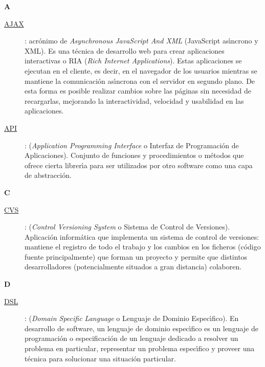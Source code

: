 {\bfseries {\Huge A}}\label{Apendice1:A}
\bigskip
\bigskip

\begin{description}
  \item[\underline{AJAX}\label{apend1:ajax}]: acr\'onimo de \textit{Asynchronous JavaScript And XML} (JavaScript as\'{\i}ncrono y XML). Es una t\'ecnica de desarrollo web para crear aplicaciones 
  interactivas o RIA (\textit{Rich Internet Applications}). Estas aplicaciones se ejecutan en el cliente, es decir, en el navegador de los usuarios mientras se 
  mantiene la comunicaci\'on as\'{\i}ncrona con el servidor en segundo plano. De esta forma es posible realizar cambios sobre las p\'aginas sin necesidad de 
  recargarlas, mejorando la interactividad, velocidad y usabilidad en las aplicaciones.
  \bigskip
\end{description}

\begin{description}
  \item[\underline{API}\label{apend1:api}]: (\textit{Application Programming Interface} o Interfaz de Programaci\'on de Aplicaciones). Conjunto de funciones y procedimientos o m\'etodos que 
  ofrece cierta librer\'{\i}a para ser utilizados por otro software como una capa de abstracci\'on. 
  \bigskip
\end{description}

\bigskip
{\bfseries {\Huge C}}\label{Apendice1:C}
\bigskip
\bigskip

\begin{description}
   \item[\underline{CVS}\label{apend1:cvs}]: (\textit{Control Versioning System} o Sistema de Control de Versiones). Aplicaci\'on inform\'atica que implementa un sistema de control de 
  versiones: mantiene el registro de todo el trabajo y los cambios en los ficheros (c\'odigo fuente principalmente) que forman un proyecto y permite que distintos desarrolladores 
  (potencialmente situados a gran distancia) colaboren.
  \bigskip
\end{description}

\bigskip
{\bfseries {\Huge D}}\label{Apendice1:D}
\bigskip
\bigskip

\begin{description}
  \item[\underline{DSL}\label{apend1:dsl}]: (\textit{Domain Specific Language} o Lenguaje de Dominio Espec\'{\i}fico). En desarrollo de software, un lenguaje de dominio espec\'{\i}fico es 
  un lenguaje de programaci\'on o especificaci\'on de un lenguaje dedicado a resolver un problema en particular, representar un problema espec\'{\i}fico 
  y proveer una t\'ecnica para solucionar una situaci\'on particular. 
\end{description}

